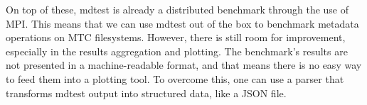 On top of these, mdtest is already a distributed benchmark through the use of MPI. This means that we can use mdtest out of the box to benchmark metadata operations on MTC filesystems. However, there is still room for improvement, especially in the results aggregation and plotting. The benchmark's results are not presented in a machine-readable format, and that means there is no easy way to feed them into a plotting tool. To overcome this, one can use a parser that transforms mdtest output into structured data, like a JSON file.
